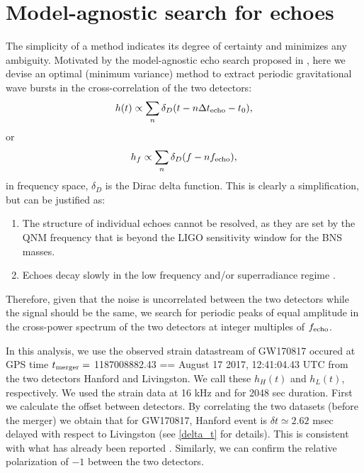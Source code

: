 \documentclass[a4paper,11pt]{article}
\newcommand{\be}{\begin{equation}}
\newcommand{\ee}{\end{equation}}
\begin{document}
\section{Model-agnostic search for echoes}\label{method}

The simplicity of a method indicates its degree of certainty and minimizes any ambiguity. Motivated by the model-agnostic echo search proposed in \cite{Conklin:2017lwb}, here we devise an optimal (minimum variance) method to extract periodic gravitational wave bursts in the cross-correlation of the two detectors:
\be
h(t) \propto \sum_n \delta_D(t-n\Delta t_{\rm echo} -t_0),
\ee 
or
\be
h_{f} \propto \sum_n \delta_D(f- n f_{\rm echo}), \label{h_f_res}
\ee
in frequency space, $\delta_D$ is the Dirac delta function. This is clearly a simplification, but can be justified as:
\begin{enumerate}
\item The structure of individual echoes cannot be resolved, as they are set by the QNM frequency that is beyond the LIGO sensitivity window for the BNS masses.
\item Echoes decay slowly in the low frequency and/or superradiance regime \cite{Wang:2018gin}.
\end{enumerate}

Therefore, given that the noise is uncorrelated between the two detectors while the signal should be the same, we search for periodic peaks of equal amplitude in the cross-power spectrum of the two detectors at integer multiples of $f_{\rm echo}$. 


In this analysis, we use the observed strain datastream of GW170817 \cite{GW170817} occured at GPS time $t_{\rm{merger}}=$ 1187008882.43 == August 17 2017, 12:41:04.43 UTC from the two detectors Hanford and Livingston. We call these $h_{H}(t)$ and $h_{L}(t)$, respectively. We used the strain data at 16 kHz and for 2048 sec duration. First we calculate the offset between detectors. By correlating the two datasets (before the merger) we obtain that for GW170817, Hanford event is $\delta t \simeq 2.62$ msec delayed with respect to Livingston (see \ref{delta_t} for details). This is consistent with what has already been reported \cite{GBM:2017lvd}. Similarly, we can confirm the relative polarization of $-1$  between the two detectors. %
\end{document}
